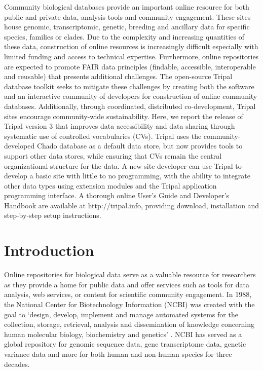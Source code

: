 Community biological databases provide an important online resource for both public and private data, analysis tools and community engagement. These sites house genomic, transcriptomic, genetic, breeding and ancillary data for specific species, families or clades. Due to the complexity and increasing quantities of these data, construction of online resources is increasingly difficult especially with limited funding and access to technical expertise. Furthermore, online repositories are expected to promote FAIR data principles (findable, accessible, interoperable and reusable) that presents additional challenges. The open-source Tripal database toolkit seeks to mitigate these challenges by creating both the software and an interactive community of developers for construction of online community databases. Additionally, through coordinated, distributed co-development, Tripal sites encourage community-wide sustainability. Here, we report the release of Tripal version 3 that improves data accessibility and data sharing through systematic use of controlled vocabularies (CVs). Tripal uses the community-developed Chado database as a default data store, but now provides tools to support other data stores, while ensuring that CVs remain the central organizational structure for the data. A new site developer can use Tripal to develop a basic site with little to no programming, with the ability to integrate other data types using extension modules and the Tripal application programming interface. A thorough online User’s Guide and Developer’s Handbook are available at http://tripal.info, providing download, installation and step-by-step setup instructions.


\section*{Introduction}


Online repositories for biological data serve as a valuable resource for researchers as they provide a home for public data and offer services such as tools for data analysis, web services, or content for scientific community engagement. In 1988, the National Center for Biotechnology Information (NCBI) was created with the goal to ‘design, develop, implement and manage automated systems for the collection, storage, retrieval, analysis and dissemination of knowledge concerning human molecular biology, biochemistry and genetics’ \cite{usc42}. NCBI has served as a global repository for genomic sequence data, gene transcriptome data, genetic variance data and more for both human and non-human species for three decades.

